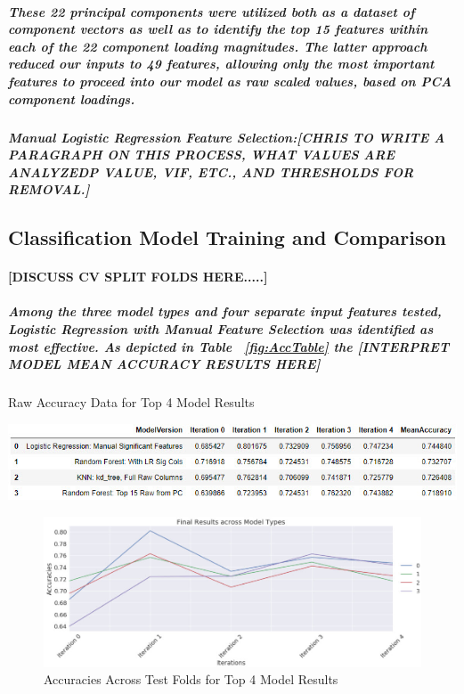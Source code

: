 \documentclass{article}
\begin{document}
\subparagraph{These 22 principal components were utilized both as a dataset of component vectors as well as to identify the top 15 features within each of the 22 component loading magnitudes. The latter approach reduced our inputs to 49 features, allowing only the most important features to proceed into our model as raw scaled values, based on PCA component loadings.}

\subparagraph{Manual Logistic Regression Feature Selection:[CHRIS TO WRITE A PARAGRAPH ON THIS PROCESS, WHAT VALUES ARE ANALYZED{P VALUE, VIF, ETC.}, AND THRESHOLDS FOR REMOVAL.]
}
 

\subsection{Classification Model Training and Comparison}

\paragraph{[DISCUSS CV SPLIT FOLDS HERE.....]}

\subparagraph{Among the three model types and four separate input features tested, Logistic Regression with Manual Feature Selection was identified as most effective. As depicted in Table ~\ref{fig:AccTable} the [INTERPRET MODEL MEAN ACCURACY RESULTS HERE]} 

\subparagraph{}
\begin{table}[H]
\centering
\caption{Raw Accuracy Data for Top 4 Model Results}
\includegraphics[width=\linewidth]{AccTable.jpg}
\label{fig:AccTable}
\end{table}

\begin{figure}[H]
\centering
\includegraphics[width=\linewidth]{AccPlot.jpg}
\caption{Accuracies Across Test Folds for Top 4 Model Results}
\label{fig:AccPlot}
\end{figure}
\end{document}
